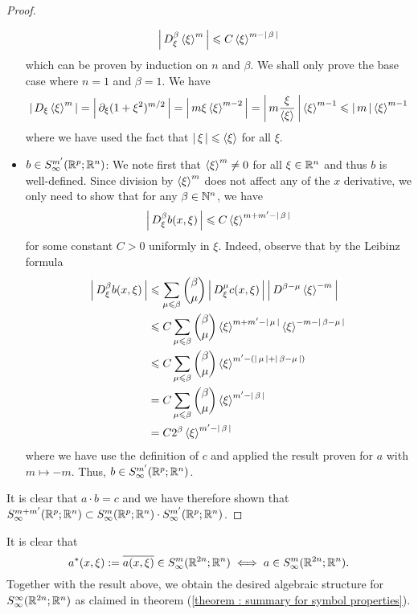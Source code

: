 \documentclass[12pt]{article}
\begin{document}
\begin{proof}
\begin{itemize}
        \[
        \abs{D^\beta_\xi \sym[\xi]^m} \leq C \sym[\xi]^{m - \abs{\beta}}
        \]
        which can be proven by induction on $n$ and $\beta$. We shall only prove the base case where $n = 1$ and $\beta = 1$. We have 
        \begin{align*}
            \abs{D_\xi \sym[\xi]^m} = \abs{\p_\xi (1 + \xi^2)^{m/2}} = \abs{m\xi \sym[\xi]^{m - 2}} = \abs{m \frac{\xi}{\sym[\xi]}} \sym[\xi]^{m - 1} \leq \abs{m} \sym[\xi]^{m - 1}
        \end{align*}
        where we have used the fact that $\abs{\xi} \leq \sym[\xi]$ for all $\xi$. 
        \item $b \in S^{m'}_\infty(\R^p; \R^n)$:  We note first that $\sym[\xi]^m \neq 0$ for all $\xi \in \R^n$ and thus $b$ is well-defined. Since division by $\sym[\xi]^m$ does not affect any of the $x$ derivative, we only need to show that for any $\beta \in \N^n$, we have
        \[
        \abs{D^\beta_\xi b(x, \xi)} \leq C \sym[\xi]^{m + m' - \abs{\beta}}
        \]
        for some constant $C > 0$ uniformly in $\xi$. Indeed, observe that by the Leibinz formula
        \begin{align*}
            \abs{D^\beta_\xi b(x, \xi)} 
            & \leq \sum_{\mu \leq \beta} \binom{\beta}{\mu} \abs{D^\mu_\xi c(x, \xi)} \abs{D^{\beta - \mu} \sym[\xi]^{-m}} \\
            & \leq C \sum_{\mu \leq \beta} \binom{\beta}{\mu} \sym[\xi]^{m + m' - \abs{\mu}} \sym[\xi]^{-m - \abs{\beta - \mu}} \\
            & \leq C \sum_{\mu \leq \beta} \binom{\beta}{\mu} \sym[\xi]^{ m' - (\abs{\mu} +  \abs{\beta - \mu})} \\
            & = C \sum_{\mu \leq \beta} \binom{\beta}{\mu} \sym[\xi]^{ m' -\abs{\beta}} \\
            &= C 2^{\beta} \sym[\xi]^{ m' -\abs{\beta}} 
        \end{align*}
        where we have use the definition of $c$ and applied the result proven for $a$ with $m \mapsto -m$. Thus, $b \in S^{m'}_\infty(\R^p; \R^n)$. 
    \end{itemize}
    It is clear that $a \cdot b = c$ and we have therefore shown that $S^{m + m'}_\infty(\R^p; \R^n) \subset S^{m}_\infty(\R^p; \R^n) \cdot S^{m'}_\infty(\R^p; \R^n)$. 
    
\end{proof}

It is clear that 
$$ a^*(x, \xi) := \overline{a(x, \xi)} \in S^{m}_\infty(\R^{2n}; \R^n) \iff a \in S^{m}_\infty(\R^{2n}; \R^n). $$ Together with the result above, we obtain the desired algebraic structure for $S^{\infty}_\infty(\R^{2n}; \R^n)$ as claimed in theorem (\ref{theorem : summary for symbol properties}). \\
\end{document}
